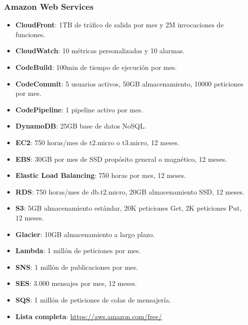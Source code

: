 \subsubsection*{Amazon Web Services}
\begin{itemize}
	\item \textbf{CloudFront}: 1TB de tráfico de salida por mes y 2M invocaciones de funciones.
	\item \textbf{CloudWatch}: 10 métricas personalizadas y 10 alarmas.
	\item \textbf{CodeBuild}: 100min de tiempo de ejecución por mes.
	\item \textbf{CodeCommit}: 5 usuarios activos, 50GB almacenamiento, 10000 peticiones por mes.
	\item \textbf{CodePipeline}: 1 pipeline activo por mes.
	\item \textbf{DynamoDB}: 25GB base de datos NoSQL.
	\item \textbf{EC2}: 750 horas/mes de t2.micro o t3.micro, 12 meses.
	\item \textbf{EBS}: 30GB por mes de SSD propósito general o magnético, 12 meses.
	\item \textbf{Elastic Load Balancing}: 750 horas por mes, 12 meses.
	\item \textbf{RDS}: 750 horas/mes de db.t2.micro, 20GB almacenamiento SSD, 12 meses.
	\item \textbf{S3}: 5GB almacenamiento estándar, 20K peticiones Get, 2K peticiones Put, 12 meses.
	\item \textbf{Glacier}: 10GB almacenamiento a largo plazo.
	\item \textbf{Lambda}: 1 millón de peticiones por mes.
	\item \textbf{SNS}: 1 millón de publicaciones por mes.
	\item \textbf{SES}: 3.000 mensajes por mes, 12 meses.
	\item \textbf{SQS}: 1 millón de peticiones de colas de mensajería.
	\item \textbf{Lista completa}: \url{https://aws.amazon.com/free/}
\end{itemize}

